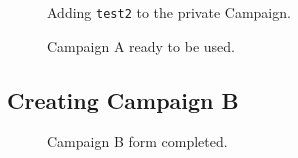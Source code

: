 \documentclass{article}
\begin{document}
		\begin{figure}[ht]
			\centering
			\caption{Adding \texttt{test2} to the private Campaign.}
			\label{fig:eval-ca-6}
		\end{figure}

		\begin{figure}[ht]
			\centering
			\caption{Campaign A ready to be used.}
			\label{fig:eval-ca-4}
		\end{figure}

		\FloatBarrier
		\subsection{Creating Campaign B}

		\begin{figure}[ht]
			\centering
			\caption{Campaign B form completed.}
			\label{fig:eval-cb-1}
		\end{figure}
\end{document}
